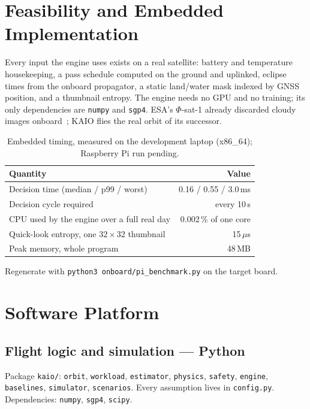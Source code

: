 \documentclass[11pt,a4paper]{article}
\newcommand{\benchboard}{development laptop (x86\_64); Raspberry Pi run pending}
\newcommand{\decmedian}{0.16}
\newcommand{\decpninetynine}{0.55}
\newcommand{\decmax}{3.0}
\newcommand{\cpuduty}{0.002}
\newcommand{\entropyus}{15}
\newcommand{\peakram}{48}
\begin{document}
\section{Feasibility and Embedded Implementation}
Every input the engine uses exists on a real satellite: battery and temperature housekeeping, a pass
schedule computed on the ground and uplinked, eclipse times from the onboard propagator, a static
land/water mask indexed by GNSS position, and a thumbnail entropy. The engine needs no GPU and no
training; its only dependencies are \texttt{numpy} and \texttt{sgp4}. ESA's $\Phi$-sat-1 already discarded
cloudy images onboard~\cite{phisat}; KAIO flies the real orbit of its successor.

\begin{table}[H]
\centering
\caption{Embedded timing, measured on the \benchboard.}
\small
\begin{tabular}{@{}lr@{}}
\toprule
\textbf{Quantity} & \textbf{Value} \\
\midrule
Decision time (median / p99 / worst) & \decmedian{} / \decpninetynine{} / \decmax{}\,ms \\
Decision cycle required & every 10\,s \\
CPU used by the engine over a full real day & \cpuduty\,\% of one core \\
Quick-look entropy, one $32\times32$ thumbnail & \entropyus\,$\mu$s \\
Peak memory, whole program & \peakram\,MB \\
\bottomrule
\end{tabular}
\end{table}
{\footnotesize\color{kmuted} Regenerate with \texttt{python3 onboard/pi\_benchmark.py} on the target board.}

\section{Software Platform}
\subsection{Flight logic and simulation --- Python}
Package \texttt{kaio/}: \texttt{orbit}, \texttt{workload}, \texttt{estimator}, \texttt{physics},
\texttt{safety}, \texttt{engine}, \texttt{baselines}, \texttt{simulator}, \texttt{scenarios}. Every
assumption lives in \texttt{config.py}. Dependencies: \texttt{numpy}, \texttt{sgp4}, \texttt{scipy}.
\end{document}
